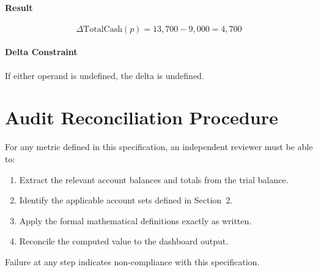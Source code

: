 \documentclass[11pt]{article}
\newcommand{\Period}{p}
\begin{document}
\paragraph{Result}
\[
\Delta \text{TotalCash}(\Period)
=
13{,}700 - 9{,}000
=
4{,}700
\]

\paragraph{Delta Constraint}
If either operand is undefined, the delta is undefined.

\section{Audit Reconciliation Procedure}

For any metric defined in this specification, an independent reviewer
must be able to:

\begin{enumerate}[label=\arabic*.]
  \item Extract the relevant account balances and totals from the trial balance.
  \item Identify the applicable account sets defined in Section~2.
  \item Apply the formal mathematical definitions exactly as written.
  \item Reconcile the computed value to the dashboard output.
\end{enumerate}

Failure at any step indicates non-compliance with this specification.
\end{document}
